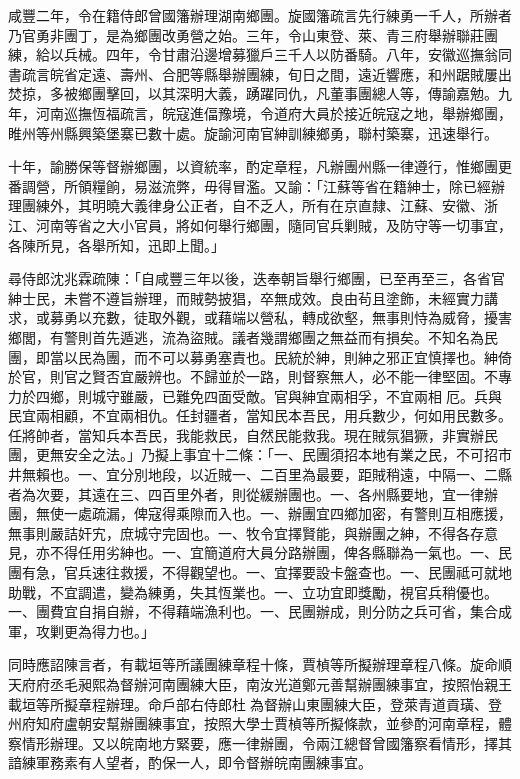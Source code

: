 \begin{pinyinscope}
咸豐二年，令在籍侍郎曾國籓辦理湖南鄉團。旋國籓疏言先行練勇一千人，所辦者乃官勇非團丁，是為鄉團改勇營之始。三年，令山東登、萊、青三府舉辦聯莊團練，給以兵械。四年，令甘肅沿邊增募獵戶三千人以防番騎。八年，安徽巡撫翁同書疏言皖省定遠、壽州、合肥等縣舉辦團練，旬日之間，遠近響應，和州踞賊屢出焚掠，多被鄉團擊回，以其深明大義，踴躍同仇，凡董事團總人等，傳諭嘉勉。九年，河南巡撫恆福疏言，皖寇進偪豫境，令道府大員於接近皖寇之地，舉辦鄉團，睢州等州縣興築堡寨已數十處。旋諭河南官紳訓練鄉勇，聯村築寨，迅速舉行。

十年，諭勝保等督辦鄉團，以資統率，酌定章程，凡辦團州縣一律遵行，惟鄉團更番調營，所領糧餉，易滋流弊，毋得冒濫。又諭：「江蘇等省在籍紳士，除已經辦理團練外，其明曉大義律身公正者，自不乏人，所有在京直隸、江蘇、安徽、浙江、河南等省之大小官員，將如何舉行鄉團，隨同官兵剿賊，及防守等一切事宜，各陳所見，各舉所知，迅即上聞。」

尋侍郎沈兆霖疏陳：「自咸豐三年以後，迭奉朝旨舉行鄉團，已至再至三，各省官紳士民，未嘗不遵旨辦理，而賊勢披猖，卒無成效。良由茍且塗飾，未經實力講求，或募勇以充數，徒取外觀，或藉端以營私，轉成欲壑，無事則恃為威脅，擾害鄉閭，有警則首先遁逃，流為盜賊。議者幾謂鄉團之無益而有損矣。不知名為民團，即當以民為團，而不可以募勇塞責也。民統於紳，則紳之邪正宜慎擇也。紳倚於官，則官之賢否宜嚴辨也。不歸並於一路，則督察無人，必不能一律堅固。不專力於四鄉，則城守雖嚴，已難免四面受敵。官與紳宜兩相孚，不宜兩相厄。兵與民宜兩相顧，不宜兩相仇。任封疆者，當知民本吾民，用兵數少，何如用民數多。任將帥者，當知兵本吾民，我能救民，自然民能救我。現在賊氛猖獗，非實辦民團，更無安全之法。」乃擬上事宜十二條：「一、民團須招本地有業之民，不可招市井無賴也。一、宜分別地段，以近賊一、二百里為最要，距賊稍遠，中隔一、二縣者為次要，其遠在三、四百里外者，則從緩辦團也。一、各州縣要地，宜一律辦團，無使一處疏漏，俾寇得乘隙而入也。一、辦團宜四鄉加密，有警則互相應援，無事則嚴詰奸宄，庶城守完固也。一、牧令宜擇賢能，與辦團之紳，不得各存意見，亦不得任用劣紳也。一、宜簡道府大員分路辦團，俾各縣聯為一氣也。一、民團有急，官兵速往救援，不得觀望也。一、宜擇要設卡盤查也。一、民團祗可就地助戰，不宜調遣，變為練勇，失其恆業也。一、立功宜即獎勵，視官兵稍優也。一、團費宜自捐自辦，不得藉端漁利也。一、民團辦成，則分防之兵可省，集合成軍，攻剿更為得力也。」

同時應詔陳言者，有載垣等所議團練章程十條，賈楨等所擬辦理章程八條。旋命順天府府丞毛昶熙為督辦河南團練大臣，南汝光道鄭元善幫辦團練事宜，按照怡親王載垣等所擬章程辦理。命戶部右侍郎杜為督辦山東團練大臣，登萊青道貢璜、登州府知府盧朝安幫辦團練事宜，按照大學士賈楨等所擬條款，並參酌河南章程，體察情形辦理。又以皖南地方緊要，應一律辦團，令兩江總督曾國籓察看情形，擇其諳練軍務素有人望者，酌保一人，即令督辦皖南團練事宜。


\end{pinyinscope}
